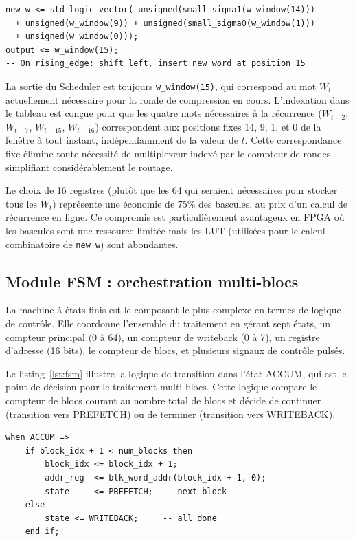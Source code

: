 \begin{lstlisting}[caption={Scheduler.vhd -- expansion par fenêtre glissante},label={lst:sched}]
new_w <= std_logic_vector( unsigned(small_sigma1(w_window(14)))
  + unsigned(w_window(9)) + unsigned(small_sigma0(w_window(1)))
  + unsigned(w_window(0)));
output <= w_window(15);
-- On rising_edge: shift left, insert new word at position 15
\end{lstlisting}

La sortie du Scheduler est toujours \texttt{w\_window(15)}, qui correspond au mot $W_t$ actuellement nécessaire pour la ronde de compression en cours. L'indexation dans le tableau est conçue pour que les quatre mots nécessaires à la récurrence ($W_{t-2}$, $W_{t-7}$, $W_{t-15}$, $W_{t-16}$) correspondent aux positions fixes 14, 9, 1, et 0 de la fenêtre à tout instant, indépendamment de la valeur de $t$. Cette correspondance fixe élimine toute nécessité de multiplexeur indexé par le compteur de rondes, simplifiant considérablement le routage.

Le choix de 16 registres (plutôt que les 64 qui seraient nécessaires pour stocker tous les $W_t$) représente une économie de 75\% des bascules, au prix d'un calcul de récurrence en ligne. Ce compromis est particulièrement avantageux en FPGA où les bascules sont une ressource limitée mais les LUT (utilisées pour le calcul combinatoire de \texttt{new\_w}) sont abondantes.

\subsection{Module FSM : orchestration multi-blocs}

La machine à états finis est le composant le plus complexe en termes de logique de contrôle. Elle coordonne l'ensemble du traitement en gérant sept états, un compteur principal (0 à 64), un compteur de writeback (0 à 7), un registre d'adresse (16 bits), le compteur de blocs, et plusieurs signaux de contrôle pulsés.

Le listing~\ref{lst:fsm} illustre la logique de transition dans l'état ACCUM, qui est le point de décision pour le traitement multi-blocs. Cette logique compare le compteur de blocs courant au nombre total de blocs et décide de continuer (transition vers PREFETCH) ou de terminer (transition vers WRITEBACK).

\begin{lstlisting}[caption={FSM -- logique de branchement multi-blocs dans l'état ACCUM},label={lst:fsm}]
when ACCUM =>
    if block_idx + 1 < num_blocks then
        block_idx <= block_idx + 1;
        addr_reg  <= blk_word_addr(block_idx + 1, 0);
        state     <= PREFETCH;  -- next block
    else
        state <= WRITEBACK;     -- all done
    end if;
\end{lstlisting}

